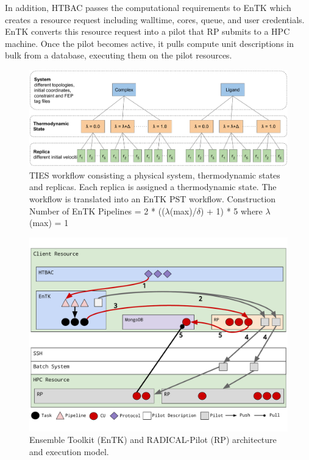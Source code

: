 In addition, HTBAC passes the computational
requirements to EnTK which creates a resource request including walltime, cores, 
queue, and user credentials. EnTK converts this resource request into a pilot 
that RP submits to a HPC machine. Once the pilot becomes active, it pulls 
compute unit descriptions in bulk from a database, executing them on the pilot 
resources. 


\begin{figure}
  \centering
   \includegraphics[width=\columnwidth]{figures/ties_workflow.pdf}
  \caption{TIES workflow consisting a physical system, thermodynamic states and 
  replicas. Each replica is assigned a thermodynamic state. The workflow is 
  translated into an EnTK PST workflow. Construction Number of EnTK 
  Pipelines = 2 * (($\lambda$(max)/$\delta$) + 1) * 5 where $\lambda$(max) = 1 }
\label{fig:ties_workflow}
\end{figure}


\begin{figure}
  \centering
   \includegraphics[width=\columnwidth]{figures/ht-bac-rp_integration.pdf}
  \caption{Ensemble Toolkit (EnTK) and RADICAL-Pilot (RP) architecture and 
  execution model.}
\label{fig:integration}
\end{figure}

